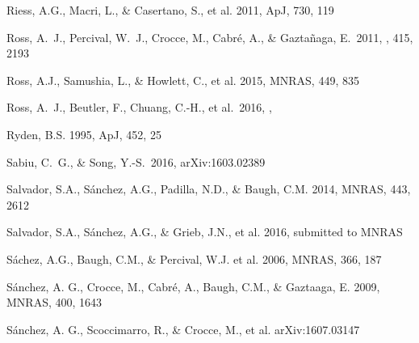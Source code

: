 \documentclass[iop]{emulateapj}
\begin{document}
\begin{thebibliography}{}
Riess, A.G., Macri, L., \& Casertano, S., et al. 2011, ApJ, 730, 119

 Ross, A.~J., Percival, W.~J., Crocce, M., Cabr{\'e}, A., \& Gazta{\~n}aga, E.\ 2011, \mnras, 415, 2193 

Ross, A.J., Samushia, L., \& Howlett, C., et al. 2015, MNRAS, 449, 835

 Ross, A.~J., Beutler, F., Chuang, C.-H., et al.\ 2016, \mnras,  

Ryden, B.S. 1995, ApJ, 452, 25  



 Sabiu, C.~G., \& Song, Y.-S.\ 2016, arXiv:1603.02389 

Salvador, S.A., S\'{a}nchez, A.G., Padilla, N.D., \& Baugh, C.M. 2014, MNRAS, 443, 2612

Salvador, S.A., S\'{a}nchez, A.G., \& Grieb, J.N., et al. 2016, submitted to MNRAS

S\'{a}chez, A.G., Baugh, C.M., \& Percival, W.J. et al. 2006, MNRAS, 366, 187

S\'{a}nchez, A. G., Crocce, M., Cabr\'{e}, A., Baugh, C.M., \& Gaztaaga, E. 2009, MNRAS, 400, 1643

S\'{a}nchez, A. G., Scoccimarro, R., \& Crocce, M., et al.
arXiv:1607.03147





\end{thebibliography}
\end{document}
